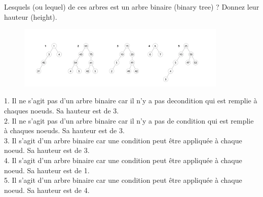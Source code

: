 \begin{Exercice}
Lesquels (ou lequel) de ces arbres est un arbre binaire (binary tree) ? Donnez leur hauteur (height).
\begin{figure}[h!]
        \centering
        \includegraphics[width=10cm]{exercice5.png}
    \end{figure}
\begin{solution}
1. Il ne s'agit pas d'un arbre binaire car il n'y a pas decondition qui est remplie à chaques noeuds. Sa hauteur est de 3.\\
2. Il ne s'agit pas d'un arbre binaire car il n'y a pas de condition qui est remplie à chaques noeuds. Sa hauteur est de 3.\\
3. Il s'agit d'un arbre binaire car une condition peut être appliquée à chaque noeud. Sa hauteur est de 3.\\
4. Il s'agit d'un arbre binaire car une condition peut être appliquée à chaque noeud. Sa hauteur est de 1.\\
5. Il s'agit d'un arbre binaire car une condition peut être appliquée à chaque noeud. Sa hauteur est de 4.\\

\end{solution}

\end{Exercice}
